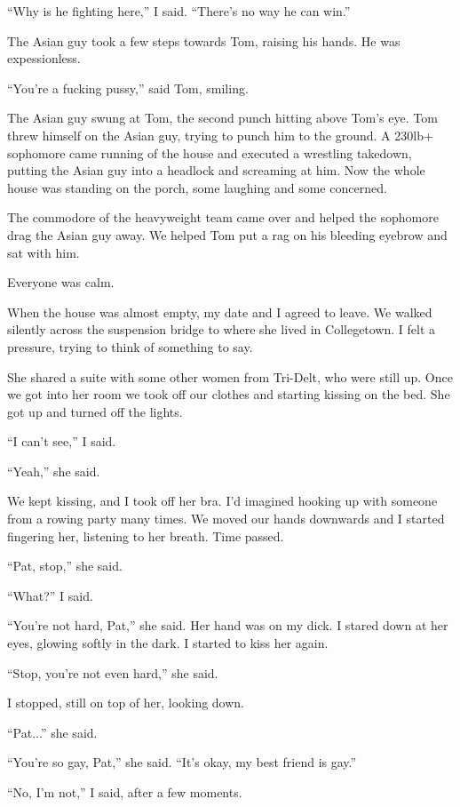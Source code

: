 ``Why is he fighting here,'' I said.  ``There's no way he can win.'' 

The Asian guy took a few steps towards Tom, raising his hands.  He was
expessionless.

``You're a fucking pussy,'' said Tom, smiling. 

The Asian guy swung at Tom, the second punch hitting above Tom's eye.  Tom threw
himself on the Asian guy, trying to punch him to the ground.  A 230lb+ sophomore
came running of the house and executed a wrestling takedown, putting the Asian
guy into a headlock and screaming at him.   Now the whole house was standing on
the porch, some laughing and some concerned.

The commodore of the heavyweight team came over and helped the sophomore drag
the Asian guy away.  We helped Tom put a rag on his bleeding eyebrow and sat
with him.  

Everyone was calm.

When the house was almost empty, my date and I agreed to leave.  We walked
silently across the suspension bridge to where she lived in Collegetown.  I felt
a pressure, trying to think of something to say.

She shared a suite with some other women from Tri-Delt, who were still up.  Once
we got into her room we took off our clothes and starting kissing on the bed.
She got up and turned off the lights.

``I can't see,'' I said.  

``Yeah,'' she said.

We kept kissing, and I took off her bra.  I'd imagined hooking up with someone
from a rowing party many times.  We moved our hands downwards and I started
fingering her, listening to her breath.  Time passed.

``Pat, stop,'' she said.

``What?'' I said.

``You're not hard, Pat,'' she said.  Her hand was on my dick.  I stared down at
her eyes, glowing softly in the dark.  I started to kiss her again.

``Stop, you're not even hard,'' she said.

I stopped, still on top of her, looking down.

``Pat...'' she said.

``You're so gay, Pat,'' she said.  ``It's okay, my best friend is gay.''

``No, I'm not,'' I said, after a few moments.

